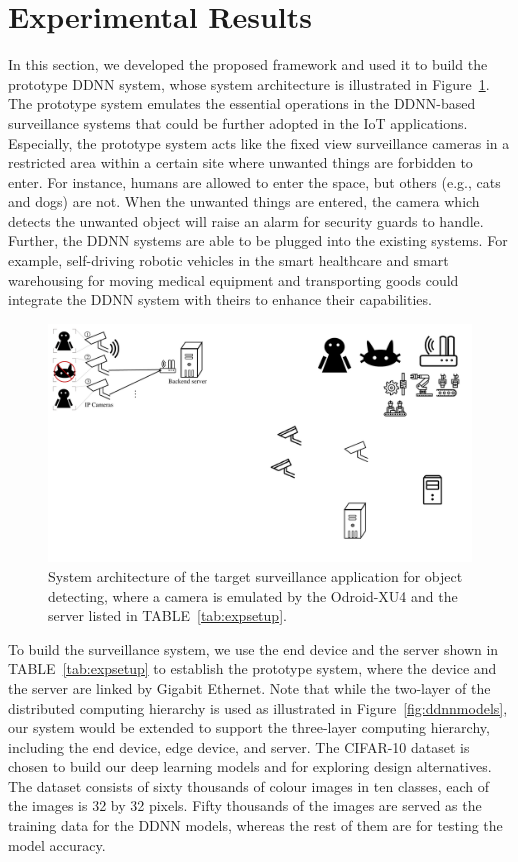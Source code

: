 \documentclass[format=acmsmall, review=false, screen=true]{acmart}
\def\figurename{Figure}
\def\tablename{TABLE}
\begin{document}
\section{Experimental Results}
\label{sec:results}
In this section, we developed the proposed framework and used it to build the prototype DDNN system, whose system architecture is illustrated in \figurename~\ref{fig:targetsysarch}. The prototype system emulates the essential operations in the DDNN-based surveillance systems that could be further adopted in the IoT applications. Especially, the prototype system acts like the fixed view surveillance cameras in a restricted area within a certain site where unwanted things are forbidden to enter. For instance, humans are allowed to enter the space, but others (e.g., cats and dogs) are not. When the unwanted things are entered, the camera which detects the unwanted object will raise an alarm for security guards to handle. Further, the DDNN systems are able to be plugged into the existing systems. For example, self-driving robotic vehicles in the smart healthcare and smart warehousing for moving medical equipment and transporting goods could integrate the DDNN system with theirs to enhance their capabilities.

	\begin{figure}[tbh!]
        \centering

        \includegraphics[width=.5\columnwidth]{figure/surveillancesystem.pdf}
        \caption{System architecture of the target surveillance application for object detecting, where a camera is emulated by the Odroid-XU4 and the server listed in \tablename~\ref{tab:expsetup}.}
        \label{fig:targetsysarch} %
    \end{figure}

To build the surveillance system, we use the end device and the server shown in \tablename~\ref{tab:expsetup} to establish the prototype system, where the device and the server are linked by Gigabit Ethernet. Note that while the two-layer of the distributed computing hierarchy is used as illustrated in \figurename~\ref{fig:ddnnmodels}, our system would be extended to support the three-layer computing hierarchy, including the end device, edge device, and server. The CIFAR-10 dataset \cite{krizhevsky2014cifar} is chosen to build our deep learning models and for exploring design alternatives. The dataset consists of sixty thousands of colour images in ten classes, each of the images is 32 by 32 pixels. Fifty thousands of the images are served as the training data for the DDNN models, whereas the rest of them are for testing the model accuracy.
\end{document}
